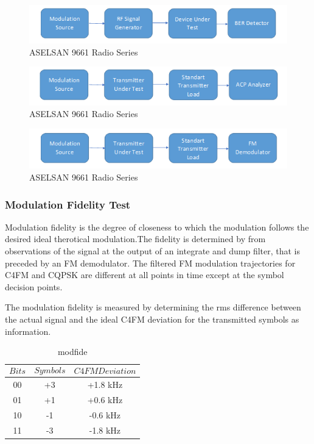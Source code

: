 \begin{figure}[H]
	\center
	\setlength{\unitlength}{\textwidth} 
	\includegraphics[width=1.0\unitlength]{refsens}
	\caption{\label{fig:refsens}ASELSAN 9661 Radio Series }
\end{figure}


\begin{figure}[H]
	\center
	\setlength{\unitlength}{\textwidth} 
	\includegraphics[width=1.0\unitlength]{transnoise}
	\caption{\label{fig:transnoise}ASELSAN 9661 Radio Series }
\end{figure}

\begin{figure}[H]
	\center
	\setlength{\unitlength}{\textwidth} 
	\includegraphics[width=1.0\unitlength]{c4fmmod}
	\caption{\label{fig:c4fmmod}ASELSAN 9661 Radio Series }
\end{figure}

\subsubsection{Modulation Fidelity Test}
\- \indent

	Modulation fidelity is the degree of closeness to which the modulation follows the desired ideal therotical modulation.The fidelity is determined by from observations of the signal at the output of an integrate and dump filter, that is preceded by an FM demodulator. The filtered FM modulation trajectories for C4FM and CQPSK are different at all points in time except at the symbol decision points.
	
	The modulation fidelity is measured by determining the rms difference between the actual signal and the ideal C4FM deviation for the transmitted symbols as information.
	
\begin{table}[H]
  \centering
 
    \begin{tabular}{c|c|c}
       $$Bits$$ & $$Symbols$$ & $$C4FM Deviation$$ \\ \hline
       00 & +3 & +1.8 kHz  \\ \hline
       01 & +1 & +0.6 kHz  \\ \hline
       10 & -1 & -0.6 kHz  \\ \hline
       11 & -3 & -1.8 kHz  
      
  \end{tabular}
  \caption{modfide}
  \label{tab:modfide}
\end{table}


